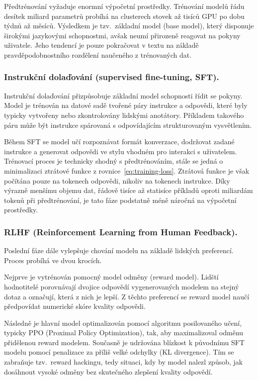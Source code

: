 Předtrénování vyžaduje enormní výpočetní prostředky.
Trénování modelů řádu desítek miliard parametrů probíhá na clusterech stovek až tisíců GPU po dobu týdnů až měsíců.
Výsledkem je tzv.\ základní model (base model), který disponuje širokými jazykovými schopnostmi, avšak neumí přirozeně reagovat na pokyny uživatele.
Jeho tendencí je pouze pokračovat v textu na základě pravděpodobnostního rozdělení naučeného z trénovaných dat.

\subsubsection*{Instrukční dolaďování (supervised fine-tuning, SFT).}
Instrukční dolaďování přizpůsobuje základní model schopnosti řídit se pokyny.
Model je trénován na datové sadě tvořené páry instrukce a odpovědi, které byly typicky vytvořeny nebo zkontrolovány lidskými anotátory.
Příkladem takového páru může být instrukce  spárovaná s odpovídajícím strukturovaným vysvětlením.

Během SFT se model učí rozpoznávat formát konverzace, dodržovat zadané instrukce a generovat odpovědi ve stylu vhodném pro interakci s uživatelem.
Trénovací proces je technicky shodný s předtrénováním, stále se jedná o minimalizaci ztrátové funkce z rovnice~\eqref{eq:training-loss}.
Ztrátová funkce je však počítána pouze na tokenech odpovědi, nikoliv na tokenech instrukce.
Díky výrazně menšímu objemu dat, řádově tisíce až statisíce příkladů oproti miliardám tokenů při předtrénování, je tato fáze podstatně méně náročná na výpočetní prostředky.

\subsubsection*{RLHF (Reinforcement Learning from Human Feedback).}
Poslední fáze dále vylepšuje chování modelu na základě lidských preferencí.
Proces probíhá ve dvou krocích.

Nejprve je vytrénován pomocný model odměny (reward model).
Lidští hodnotitelé porovnávají dvojice odpovědí vygenerovaných modelem na stejný dotaz a označují, která z nich je lepší.
Z těchto preferencí se reward model naučí předpovídat numerické skóre kvality odpovědi.

Následně je hlavní model optimalizován pomocí algoritmu posilovaného učení, typicky PPO (Proximal Policy Optimization), tak, aby maximalizoval odměnu přidělenou reward modelem.
Současně je udržována blízkost k původnímu SFT modelu pomocí penalizace za příliš velké odchylky (KL divergence).
Tím se zabraňuje tzv.\ reward hackingu, tedy situaci, kdy by model nalezl způsob, jak dosáhnout vysoké odměny bez skutečného zlepšení kvality odpovědí.

